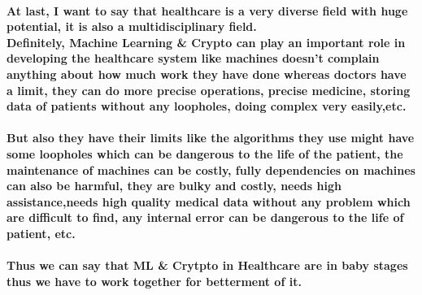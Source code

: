 \documentclass{article}
\begin{document}
    \paragraph{At last, I want to say that healthcare is a very diverse field with huge potential, it is also a multidisciplinary field. \\
    Definitely, Machine Learning \& Crypto can play an important role in developing the healthcare system like machines doesn't complain anything about how much work they have done whereas doctors have a limit, they can do more precise operations, precise medicine, storing data of patients without any loopholes, doing complex very easily,etc.\\\\
    But also they have their limits like the algorithms they use might have some loopholes which can be dangerous to the life of the patient, the maintenance of machines can be costly, fully dependencies on machines can also be harmful, they are bulky and costly, needs high assistance,needs high quality medical data without any problem which are difficult to find, any internal error can be dangerous to the life of patient, etc.\\\\
    Thus we can say that ML \& Crytpto in Healthcare are in baby stages thus we have to work together for betterment of it.}
\end{document}
